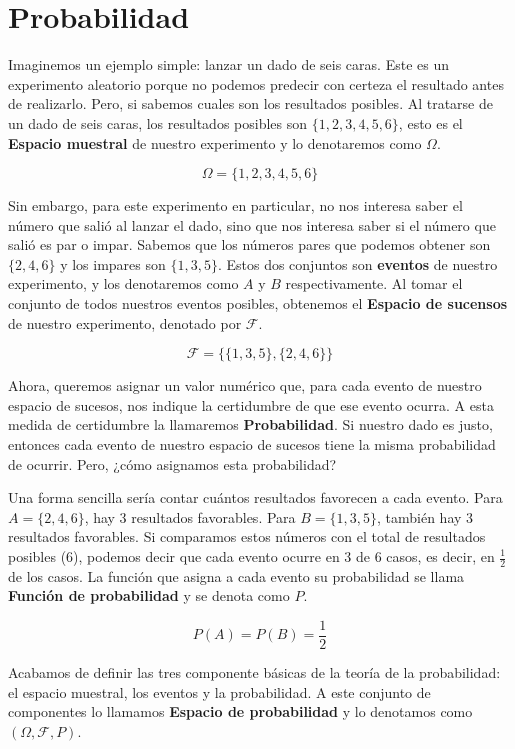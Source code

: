 \section{Probabilidad}

Imaginemos un ejemplo simple: lanzar un dado de seis caras. Este es un experimento aleatorio porque
 no podemos predecir con certeza el resultado antes de realizarlo. Pero, si sabemos cuales son los resultados posibles.
 Al tratarse de un dado de seis caras, los resultados posibles son $\{1, 2, 3, 4, 5, 6\}$, esto es el \textbf{Espacio muestral}
 de nuestro experimento y lo denotaremos como $\Omega$.

$$
\Omega = \{1, 2, 3, 4, 5, 6\}
$$

Sin embargo, para este experimento en particular, no nos interesa saber el número que salió al lanzar el dado, sino que nos interesa
saber si el número que salió es par o impar. Sabemos que los números pares que podemos obtener son $\{2, 4, 6\}$ y los impares son $\{1, 3, 5\}$.
Estos dos conjuntos son \textbf{eventos} de nuestro experimento, y los denotaremos como $A$ y $B$ respectivamente. Al tomar el conjunto de
todos nuestros eventos posibles, obtenemos el \textbf{Espacio de sucensos} de nuestro experimento, denotado por $\mathcal{F}$.

$$
\mathcal{F} = \{\{1, 3, 5\}, \{2, 4, 6\}\}
$$

Ahora, queremos asignar un valor numérico que, para cada evento de nuestro espacio de sucesos, nos indique la certidumbre de que
ese evento ocurra. A esta medida de certidumbre la llamaremos \textbf{Probabilidad}. Si nuestro dado es justo, entonces
cada evento de nuestro espacio de sucesos tiene la misma probabilidad de ocurrir. Pero, ¿cómo asignamos esta probabilidad?

Una forma sencilla sería contar cuántos resultados favorecen a cada evento. Para $A=\{2,4,6\}$, hay 3 resultados favorables.
Para $B=\{1,3,5\}$, también hay 3 resultados favorables. Si comparamos estos números con el total de resultados posibles ($6$), podemos decir
que cada evento ocurre en $3$ de $6$ casos, es decir, en $\frac{1}{2}$ de los casos. La función que asigna a cada evento su probabilidad
se llama \textbf{Función de probabilidad} y se denota como $P$.

$$
P(A) = P(B) = \frac{1}{2}
$$

Acabamos de definir las tres componente básicas de la teoría de la probabilidad: el espacio muestral, los eventos y la probabilidad. A este
conjunto de componentes lo llamamos \textbf{Espacio de probabilidad} y lo denotamos como $(\Omega, \mathcal{F}, P)$.



